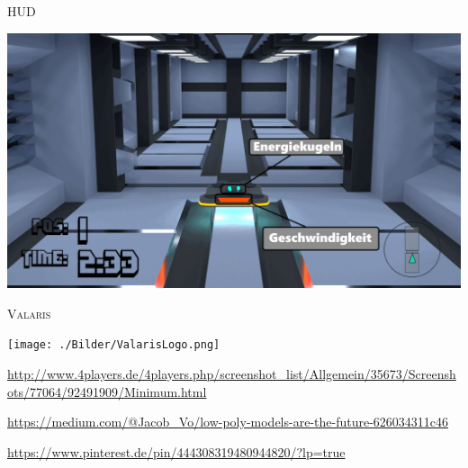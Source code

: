 \documentclass[10pt]{beamer}
\begin{document}
\begin{frame}{HUD}

    \begin{center}
        \includegraphics[width=1.0\linewidth]{./Bilder/HudMockUp.png}
    \end{center}

\end{frame}

\begin{frame}

    \centering
        {\scshape\LARGE Valaris \par}
    
    \vspace{1cm}

    \texttt{[image: ./Bilder/ValarisLogo.png]}

    \vspace{1cm}
    
    \tiny{\url{http://www.4players.de/4players.php/screenshot_list/Allgemein/35673/Screenshots/77064/92491909/Minimum.html}}\par
    \url{https://medium.com/@Jacob_Vo/low-poly-models-are-the-future-626034311c46}\par
    \url{https://www.pinterest.de/pin/444308319480944820/?lp=true}

\end{frame}

\end{document}
